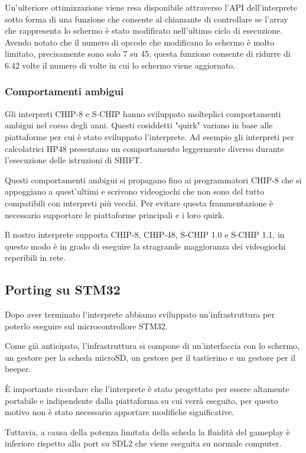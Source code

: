 \documentclass[a4paper]{article}
\begin{document}
Un'ulteriore ottimizzazione viene resa disponibile attraverso l'API dell'interprete sotto forma
di una funzione che consente al chiamante di controllare se l'array che rappresenta lo schermo è
stato modificato nell'ultimo ciclo di esecuzione. Avendo notato che il numero di opcode che
modificano lo schermo è molto limitato, precisamente sono solo 7 su 45, questa funzione
consente di ridurre di 6.42 volte il numero di volte in cui lo schermo viene aggiornato.

\subsubsection{Comportamenti ambigui}

Gli interpreti CHIP-8 e S-CHIP hanno sviluppato molteplici
comportamenti ambigui nel corso degli anni. Questi cosiddetti
"quirk" variano in base alle piattaforme per cui è stato sviluppato
l'interprete. Ad esempio gli interpreti per calcolatrici HP48
presentano un comportamento leggermente diverso durante l'esecuzione
delle istruzioni di SHIFT.

Questi comportamenti ambigui si propagano fino ai programmatori
CHIP-8 che si appoggiano a quest'ultimi e scrivono videogiochi che
non sono del tutto compatibili con interpreti più vecchi. Per evitare
questa frammentazione è necessario supportare le piattaforme
principali e i loro quirk.

Il nostro interprete supporta CHIP-8, CHIP-48, S-CHIP 1.0 e
S-CHIP 1.1, in questo modo è in grado di eseguire la stragrande
maggioranza dei videogiochi reperibili in rete.

\subsection{Porting su STM32}

Dopo aver terminato l'interprete abbiamo sviluppato un'infrastruttura per poterlo eseguire
sul microcontrollore STM32.

Come già anticipato, l'infrastruttura si compone di un'interfaccia con lo schermo,
un gestore per la scheda microSD, un gestore per il tastierino e un gestore per il beeper.

È importante ricordare che l'interprete è stato progettato per essere altamente portabile
e indipendente dalla piattaforma su cui verrà eseguito, per questo motivo non è stato necessario
apportare modifiche significative.

Tuttavia, a causa della potenza limitata della scheda la fluidità del gameplay è inferiore
rispetto alla port su SDL2 che viene eseguita su normale computer.
\end{document}
